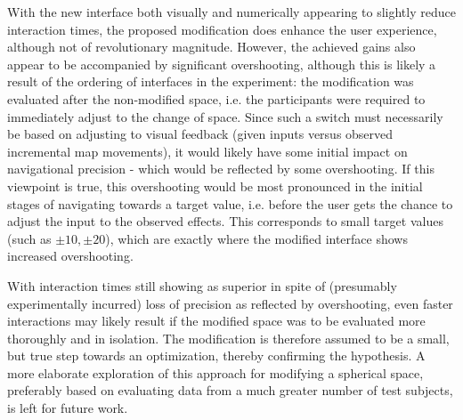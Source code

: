 With the new interface both visually and numerically appearing  to slightly reduce interaction times, the proposed modification does enhance the user experience, although not of revolutionary magnitude. However, the achieved gains also appear to be accompanied by significant overshooting, although this is likely a result of the ordering of interfaces in the experiment: the modification was evaluated after the non-modified space, i.e. the participants were required to immediately adjust to the change of space. Since such a switch must necessarily be based on adjusting to visual feedback (given inputs versus observed incremental map movements), it would likely have some initial impact on navigational precision - which would be reflected by some overshooting. If this viewpoint is true, this overshooting would be most pronounced in the initial stages of navigating towards a target value, i.e. before the user gets the chance to adjust the input to the observed effects. This corresponds to small target values (such as $\pm10, \pm20$), which are exactly where the modified interface shows increased overshooting.  


With interaction times still showing as superior in spite of (presumably experimentally incurred) loss of precision as reflected by overshooting, even faster interactions may likely result if the modified space was to be evaluated more thoroughly and in isolation. The modification is therefore assumed to be a small, but true step towards an optimization, thereby confirming the hypothesis. A more elaborate exploration of this approach for modifying a spherical space, preferably based on evaluating data from a much greater number of test subjects, is left for future work.




